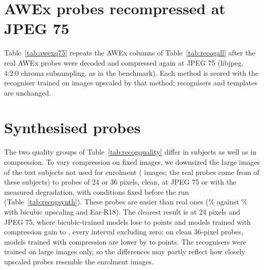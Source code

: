 \section{AWEx probes recompressed at JPEG 75}
\label{app:awexq75}
Table~\ref{tab:awexq75} repeats the AWEx columns of Table~\ref{tab:recogall} after the real AWEx probes were decoded and compressed again at JPEG 75 (libjpeg, 4:2:0 chroma subsampling, as in the benchmark). Each method is scored with the recogniser trained on images upscaled by that method; recognisers and templates are unchanged.

\begin{table}[H]
\centering
\caption{Rank-1 rate (\%) of real AWEx probes under the main protocol, as distributed and recompressed at JPEG 75, with the paired difference from bicubic upscaling in percentage points (95\% confidence intervals, bootstrap over subjects).}
\label{tab:awexq75}
\small
{}
\end{table}

\section{Synthesised probes}
\label{app:recogsynth}
The two quality groups of Table~\ref{tab:recogquality} differ in subjects as well as in compression. To vary compression on fixed images, we downsized the large images of the \SynSubj{} test subjects not used for enrolment (\SynProbes{} images; the real probes come from \RecSubj{} of these subjects) to probes of 24 or 36 pixels, clean, at JPEG 75 or with the measured degradation, with conditions fixed before the run (Table~\ref{tab:recogsynth}). These probes are easier than real ones (\SynBicEstS{}\% against \RecRankBic{}\% with bicubic upscaling and Ear-R18). The clearest result is at 24 pixels and JPEG 75, where bicubic-trained models lose \SynJpgBicTrMin{} to \SynJpgBicTrMax{} points and models trained with compression gain \SynJpgCmpTrMin{} to \SynJpgCmpTrMax{}, every interval excluding zero; on clean 36-pixel probes, models trained with compression are lower by \SynCleanCmpTrLMin{} to \SynCleanCmpTrLMax{} points. The recognisers were trained on large images only, so the differences may partly reflect how closely upscaled probes resemble the enrolment images.

